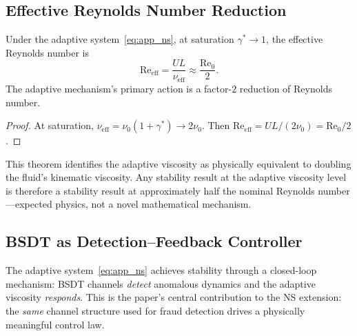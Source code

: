 \subsection{Effective Reynolds Number Reduction}
\label{app:ns:re_reduction}

\begin{theorem}\label{thm:re_halving}
Under the adaptive system~\eqref{eq:app_ns}, at saturation
$\gamma^* \to 1$, the effective Reynolds number is
\[
  \mathrm{Re}_{\mathrm{eff}} = \frac{UL}{\nu_{\mathrm{eff}}}
  \approx \frac{\mathrm{Re}_0}{2}.
\]
The adaptive mechanism's primary action is a
factor-$2$ reduction of Reynolds number.
\end{theorem}

\begin{proof}
At saturation, $\nu_{\mathrm{eff}} = \nu_0(1 + \gamma^*) \to 2\nu_0$.
Then $\mathrm{Re}_{\mathrm{eff}} = UL/(2\nu_0) = \mathrm{Re}_0/2$.
\end{proof}

\begin{remark}
This theorem identifies the adaptive viscosity as physically
equivalent to doubling the fluid's kinematic viscosity.  Any
stability result at the adaptive viscosity level is therefore
a stability result at approximately half the nominal Reynolds
number---expected physics, not a novel mathematical mechanism.
\end{remark}

\subsection{BSDT as Detection--Feedback Controller}
\label{app:ns:feedback}

The adaptive system~\eqref{eq:app_ns} achieves stability through
a closed-loop mechanism: BSDT channels \emph{detect} anomalous
dynamics and the adaptive viscosity \emph{responds}.  This is
the paper's central contribution to the NS extension: the
\emph{same} channel structure used for fraud detection
drives a physically meaningful control law.

